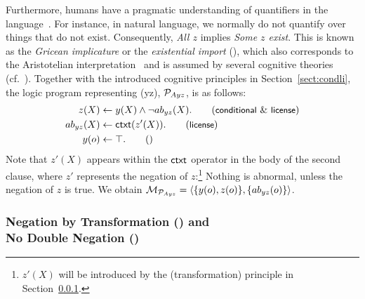 \documentclass[12pt]{article}
\begin{document}
Furthermore, humans have a pragmatic understanding of quantifiers in the language~\cite{grice1975}.
For instance, in natural language, we normally do not quantify over things that do not exist.
Consequently, \textit{All $z$} implies \textit{Some $z$ exist}.
This is known as the \textit{Gricean implicature} or the \textit{existential import} (),
which also corresponds to the Aristotelian interpretation~\cite{parry:1991} and is assumed by several cognitive theories (cf.~\cite{johnsonlaird:1983,Rips1994}). 
Together with the introduced cognitive principles in Section~\ref{sect:condli}, the logic program representing (\MA yz), ${\cal P}_{Ayz}$, is as follows:
\begin{align} %
z(X) & \leftarrow  y(X) \wedge \neg \Ab_{yz}(X). 
\tag{\conditionals\ \&\ \licenses} \\
\Ab_{yz}(X) & \leftarrow \cxt(z'(X)). \tag{\licenses}\\
y(o) & \leftarrow \top. \tag{}
\end{align}
Note that $z'(X)$ appears within the $\mathsf{ctxt}$ operator in the body of the second clause, where $z'$ represents the negation of $z$:\footnote{$z'(X)$ will be introduced by the (\footnotesize{\textsf{transformation}}) principle in Section~\ref{sect:dneg}.}
Nothing is abnormal, unless the negation of $z$ is true.
We obtain \quad ${\cal M}_{{\cal P}_{Ayz}} = \langle \{y(o),z(o)\}, \{ab_{yz}(o)\} \rangle$.


\subsubsection{Negation by Transformation (\transformation) and \\No Double Negation (\dnegation)} \label{sect:dneg}
\end{document}
